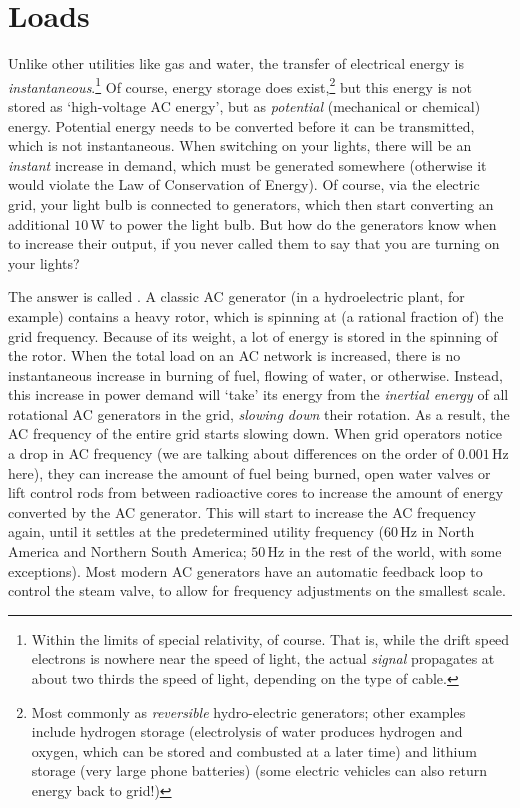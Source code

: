\documentclass[main.tex]{subfiles}
\begin{document}
\section{Loads}\label{sec:loads}
Unlike other utilities like gas and water, the transfer of electrical energy is \emph{instantaneous}.\footnote{Within the limits of special relativity, of course. That is, while the drift speed electrons is nowhere near the speed of light, the actual \emph{signal} propagates at about two thirds the speed of light, depending on the type of cable.} Of course, energy storage does exist,\footnote{Most commonly as \emph{reversible} hydro-electric generators; other examples include hydrogen storage (electrolysis of water produces hydrogen and oxygen, which can be stored and combusted at a later time) and lithium storage (very large phone batteries) (some electric vehicles can also return energy back to grid!)} but this energy is not stored as `high-voltage AC energy', but as \emph{potential} (mechanical or chemical) energy. Potential energy needs to be converted before it can be transmitted, which is not instantaneous. When switching on your lights, there will be an \emph{instant} increase in demand, which must be generated somewhere (otherwise it would violate the Law of Conservation of Energy). Of course, via the electric grid, your light bulb is connected to generators, which then start converting an additional $10 \, \si{\watt}$ to power the light bulb. But how do the generators know when to increase their output, if you never called them to say that you are turning on your lights? 

The answer is called . A classic AC generator (in a hydroelectric plant, for example) contains a heavy rotor, which is spinning at (a rational fraction of) the grid frequency. Because of its weight, a lot of energy is stored in the spinning of the rotor. When the total load on an AC network is increased, there is no instantaneous increase in burning of fuel, flowing of water, or otherwise. Instead, this increase in power demand will `take' its energy from the \emph{inertial energy} of all rotational AC generators in the grid, \emph{slowing down} their rotation. As a result, the AC frequency of the entire grid starts slowing down. When grid operators notice a drop in AC frequency (we are talking about differences on the order of $0.001\,\si{\hertz}$ here), they can increase the amount of fuel being burned, open water valves or lift control rods from between radioactive cores to increase the amount of energy converted by the AC generator. This will start to increase the AC frequency again, until it settles at the predetermined utility frequency ($60\,\si{\hertz}$ in North America and Northern South America; $50\,\si{\hertz}$ in the rest of the world, with some exceptions).
Most modern AC generators have an automatic feedback loop to control the steam valve, to allow for frequency adjustments on the smallest scale.
\end{document}
